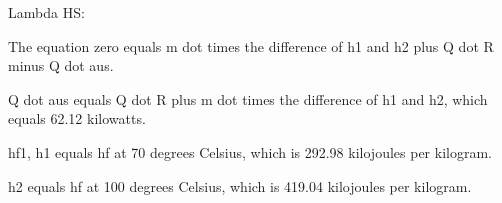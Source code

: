 Lambda HS:

The equation zero equals m dot times the difference of h1 and h2 plus Q dot R minus Q dot aus.

Q dot aus equals Q dot R plus m dot times the difference of h1 and h2, which equals 62.12 kilowatts.

hf1, h1 equals hf at 70 degrees Celsius, which is 292.98 kilojoules per kilogram.

h2 equals hf at 100 degrees Celsius, which is 419.04 kilojoules per kilogram.